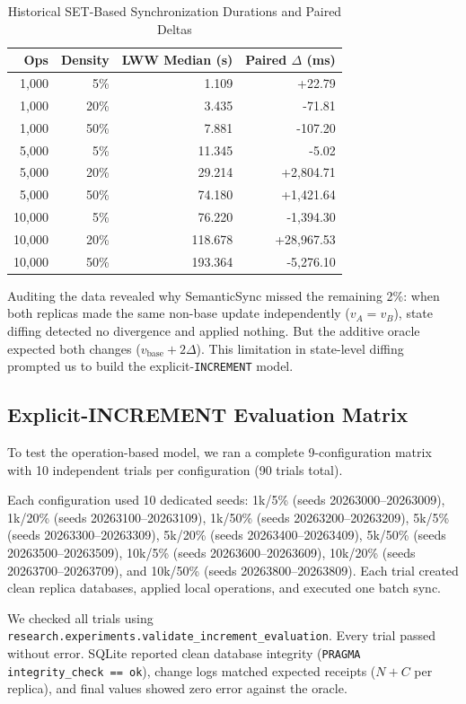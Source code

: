 \documentclass[conference]{IEEEtran}
\begin{document}
\begin{table}[!t]
\centering
\caption{Historical SET-Based Synchronization Durations and Paired Deltas}
\label{tab:set_timing}
\begin{tabular}{rrrr}
\toprule
\textbf{Ops} & \textbf{Density} & \textbf{LWW Median (s)} & \textbf{Paired $\Delta$ (ms)} \\
\midrule
1,000 & 5\% & 1.109 & +22.79 \\
1,000 & 20\% & 3.435 & -71.81 \\
1,000 & 50\% & 7.881 & -107.20 \\
5,000 & 5\% & 11.345 & -5.02 \\
5,000 & 20\% & 29.214 & +2,804.71 \\
5,000 & 50\% & 74.180 & +1,421.64 \\
10,000 & 5\% & 76.220 & -1,394.30 \\
10,000 & 20\% & 118.678 & +28,967.53 \\
10,000 & 50\% & 193.364 & -5,276.10 \\
\bottomrule
\end{tabular}
\end{table}

Auditing the data revealed why SemanticSync missed the remaining 2\%: when both replicas made the same non-base update independently ($v_A = v_B$), state diffing detected no divergence and applied nothing. But the additive oracle expected both changes ($v_{\text{base}} + 2\Delta$). This limitation in state-level diffing prompted us to build the explicit-\texttt{INCREMENT} model.

\subsection{Explicit-INCREMENT Evaluation Matrix}
To test the operation-based model, we ran a complete 9-configuration matrix with 10 independent trials per configuration (90 trials total).

Each configuration used 10 dedicated seeds: 1k/5\% (seeds 20263000--20263009), 1k/20\% (seeds 20263100--20263109), 1k/50\% (seeds 20263200--20263209), 5k/5\% (seeds 20263300--20263309), 5k/20\% (seeds 20263400--20263409), 5k/50\% (seeds 20263500--20263509), 10k/5\% (seeds 20263600--20263609), 10k/20\% (seeds 20263700--20263709), and 10k/50\% (seeds 20263800--20263809). Each trial created clean replica databases, applied local operations, and executed one batch sync.

We checked all trials using \texttt{research.experiments.validate\_increment\_evaluation}. Every trial passed without error. SQLite reported clean database integrity (\texttt{PRAGMA integrity\_check == ok}), change logs matched expected receipts ($N + C$ per replica), and final values showed zero error against the oracle.
\end{document}
